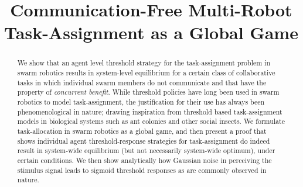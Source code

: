 \documentclass[conference]{ieeeconf}
\begin{document}
\title{Communication-Free Multi-Robot Task-Assignment as a Global Game}

\author{
\and
{}
}

\maketitle

\begin{abstract}
We show that an agent level threshold strategy for the task-assignment problem in swarm robotics results in system-level equilibrium for a certain class of collaborative tasks in which individual swarm members do not communicate and that have the property of \emph{concurrent benefit}. While threshold policies have long been used in swarm robotics to model task-assignment, the justification for their use has always been phenomenological in nature; drawing inspiration from threshold based task-assignment models in biological systems such as ant colonies and other social insects. We formulate task-allocation in swarm robotics as a global game, and then present a proof that shows individual agent threshold-response strategies for task-assignment do indeed result in system-wide equilibrium (but not necessarily system-wide optimum), under certain conditions. We then show analytically how Gaussian noise in perceiving the stimulus signal leads to sigmoid threshold responses as are commonly observed in nature. 
\end{abstract}

\IEEEpeerreviewmaketitle

\end{document}
